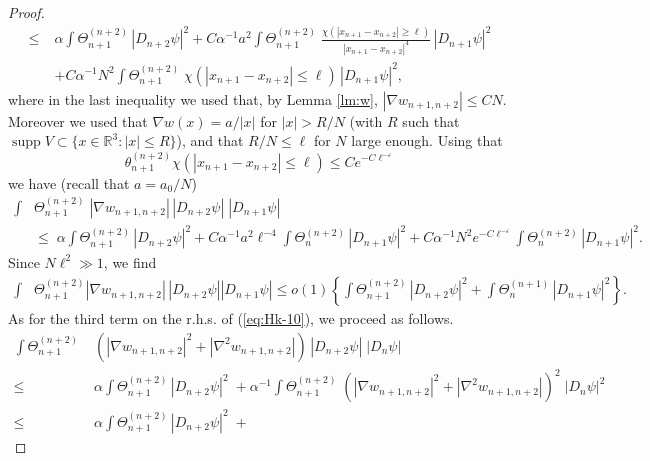 \documentclass[11pt]{article}
\newcommand{\eps}{\varepsilon}
\renewcommand{\a}{\alpha}
\newcommand{\bR}{{\mathbb R}}
\newcommand{\supp}{\operatorname{supp}}
\begin{document}
\begin{proof}
\begin{equation}
\begin{split}
\leq \; & \a \int \Theta^{(n+2)}_{n+1} \, |D_{n+2}\psi|^2 + C
\a^{-1} a^2 \int \Theta^{(n+2)}_{n+1} \; \frac{\chi (|x_{n+1} -
x_{n+2}|
\geq \ell)}{|x_{n+1} -x_{n+2}|^4} \, |D_{n+1} \psi|^2 \\
&+ C \a^{-1} N^2 \int \Theta^{(n+2)}_{n+1} \; \chi (|x_{n+1} -
x_{n+2}|\leq \ell) \, |D_{n+1}\psi|^2 ,
\end{split}
\end{equation}
where in the last inequality we used that, by Lemma \ref{lm:w},
$|\nabla w_{n+1,n+2}| \leq C N$. Moreover we used that $\nabla w (x)
= a/|x|$ for $|x|
>R/N$ (with $R$ such that $\supp V \subset \{ x \in \bR^3: |x| \leq
R \}$), and that $R/N \leq \ell $ for $N$ large enough. Using that
\begin{equation} \label{eq:cut} \theta^{(n+2)}_{n+1} \chi (|x_{n+1}
- x_{n+2}| \leq \ell) \leq C e^{-C\ell^{-\eps}} \end{equation} we
have (recall that $a=a_0/N$)
\begin{equation*}
\begin{split}
\int &\Theta^{(n+2)}_{n+1} \; |\nabla w_{n+1,n+2}| \, |D_{n+2}\psi|
\; |D_{n+1} \psi|
\\ &\leq \;
\a \int \Theta^{(n+2)}_{n+1} \, |D_{n+2}\psi|^2 +C \a^{-1} a^2
\ell^{-4} \int \Theta^{(n+2)}_{n} \, |D_{n+1}\psi|^2 + C \a^{-1} N^2
e^{-C\ell^{-\eps}}  \int \Theta^{(n+2)}_{n} \, |D_{n+1} \psi|^2.
\end{split}
\end{equation*}
Since $N\ell^{2} \gg 1$, we find
\begin{equation}\label{eq:Hk-11}
\begin{split}
\int &\Theta^{(n+2)}_{n+1} |\nabla w_{n+1,n+2}| \, |D_{n+2}\psi|
|D_{n+1} \psi| \leq o(1) \left\{ \int \Theta^{(n+2)}_{n+1} \,
|D_{n+2}\psi|^2 + \int \Theta^{(n+1)}_{n} \, |D_{n+1}\psi|^2
\right\}.
\end{split}
\end{equation}
As for the third term on the r.h.s. of (\ref{eq:Hk-10}), we proceed
as follows.
\begin{equation}
\begin{split}
 \int \Theta^{(n+2)}_{n+1}
\;&\left( |\nabla w_{n+1,n+2}|^2 + |\nabla^2 w_{n+1,n+2}|\right) \,
|D_{n+2}\psi| \; |D_{n} \psi|
\\ \leq \; & \a \int \Theta^{(n+2)}_{n+1} \, |D_{n+2}\psi|^2 \; +
\a^{-1}  \int \Theta^{(n+2)}_{n+1} \; \left( |\nabla w_{n+1,n+2}|^2
+ |\nabla^2 w_{n+1,n+2}|\right)^2 \; |D_{n} \psi|^2
\\ \leq \; &\a \int \Theta^{(n+2)}_{n+1} \, |D_{n+2}\psi|^2 \; +

\end{split}
\end{equation}
\end{proof}
\end{document}
